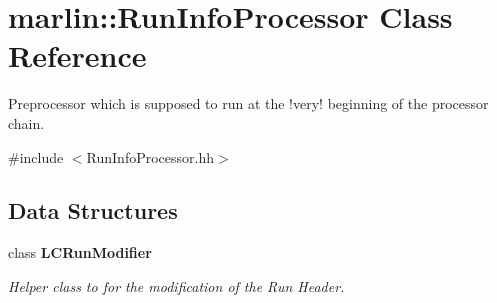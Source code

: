 \section{marlin::RunInfoProcessor Class Reference}
\label{classmarlin_1_1RunInfoProcessor}


Preprocessor which is supposed to run at the !very! beginning of the processor chain.  


{\ttfamily \#include $<$RunInfoProcessor.hh$>$}\subsection*{Data Structures}
\begin{DoxyCompactItemize}
\item 
class {\bf LCRunModifier}
\begin{DoxyCompactList}\small\item\em Helper class to for the modification of the Run Header. \item\end{DoxyCompactList}\end{DoxyCompactItemize}
